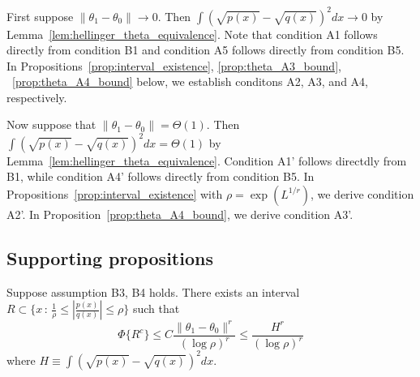 
First suppose $\| \theta_1 - \theta_0 \| \rightarrow 0$. Then $\int (\sqrt{p(x)} - \sqrt{q(x)})^2 dx \rightarrow 0$ by Lemma~\ref{lem:hellinger_theta_equivalence}. Note that condition A1 follows directly from condition B1 and condition A5 follows directly from condition B5. In Propositions~\ref{prop:interval_existence}, \ref{prop:theta_A3_bound}, ~\ref{prop:theta_A4_bound} below, we establish conditons A2, A3, and A4, respectively.

Now suppose that $\| \theta_1 - \theta_0 \| = \Theta(1)$. Then $\int (\sqrt{p(x)} - \sqrt{q(x)})^2 dx = \Theta(1)$ by Lemma~\ref{lem:hellinger_theta_equivalence}. Condition A1' follows directdly from B1, while condition A4' follows directly from condition B5. In Propositions~\ref{prop:interval_existence} with $\rho = \exp(L^{1/r})$, we derive condition A2'. In Proposition~\ref{prop:theta_A4_bound}, we derive condition A3'.

\subsection{Supporting propositions}

\begin{proposition}
\label{prop:interval_existence}
Suppose assumption B3, B4 holds. There exists an interval $R \subset \{ x \,:\, \frac{1}{\rho} \leq \left| \frac{p(x)}{q(x)} \right| \leq \rho \}$ such that
\[
\Phi \{ R^c \} \leq C \frac{ \| \theta_1 - \theta_0 \|^r }{ (\log \rho)^r } \leq \frac{H^r}{ (\log \rho)^r}
\]
where $H \equiv \int (\sqrt{p(x)} - \sqrt{q(x)} )^2 dx$. 
\end{proposition}

